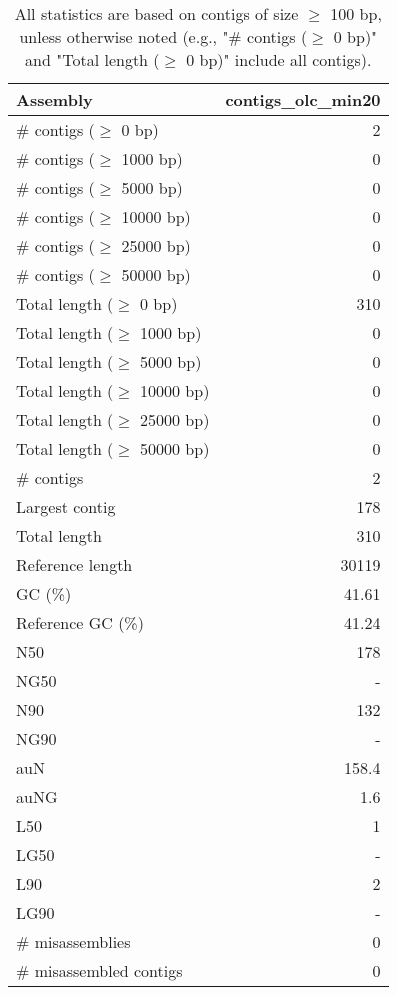 \documentclass[12pt,a4paper]{article}
\begin{document}
\begin{table}[ht]
\begin{center}
\caption{All statistics are based on contigs of size $\geq$ 100 bp, unless otherwise noted (e.g., "\# contigs ($\geq$ 0 bp)" and "Total length ($\geq$ 0 bp)" include all contigs).}
\begin{tabular}{|l*{1}{|r}|}
\hline
Assembly & contigs\_olc\_min20 \\ \hline
\# contigs ($\geq$ 0 bp) & 2 \\ \hline
\# contigs ($\geq$ 1000 bp) & 0 \\ \hline
\# contigs ($\geq$ 5000 bp) & 0 \\ \hline
\# contigs ($\geq$ 10000 bp) & 0 \\ \hline
\# contigs ($\geq$ 25000 bp) & 0 \\ \hline
\# contigs ($\geq$ 50000 bp) & 0 \\ \hline
Total length ($\geq$ 0 bp) & 310 \\ \hline
Total length ($\geq$ 1000 bp) & 0 \\ \hline
Total length ($\geq$ 5000 bp) & 0 \\ \hline
Total length ($\geq$ 10000 bp) & 0 \\ \hline
Total length ($\geq$ 25000 bp) & 0 \\ \hline
Total length ($\geq$ 50000 bp) & 0 \\ \hline
\# contigs & 2 \\ \hline
Largest contig & 178 \\ \hline
Total length & 310 \\ \hline
Reference length & 30119 \\ \hline
GC (\%) & 41.61 \\ \hline
Reference GC (\%) & 41.24 \\ \hline
N50 & 178 \\ \hline
NG50 & - \\ \hline
N90 & 132 \\ \hline
NG90 & - \\ \hline
auN & 158.4 \\ \hline
auNG & 1.6 \\ \hline
L50 & 1 \\ \hline
LG50 & - \\ \hline
L90 & 2 \\ \hline
LG90 & - \\ \hline
\# misassemblies & 0 \\ \hline
\# misassembled contigs & 0 \\ \hline

\end{tabular}
\end{center}
\end{table}
\end{document}
